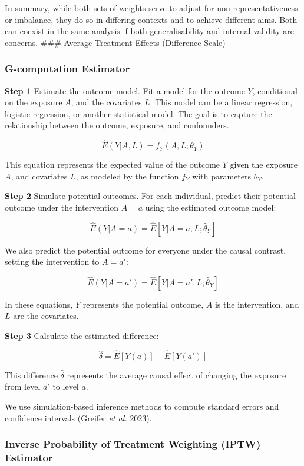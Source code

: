 \documentclass[
  singlecolumn]{article}
\begin{document}
In summary, while both sets of weights serve to adjust for
non-representativeness or imbalance, they do so in differing contexts
and to achieve different aims. Both can coexist in the same analysis if
both generalisability and internal validity are concerns. \#\#\# Average
Treatment Effects (Difference Scale)

\subsubsection{\texorpdfstring{\textbf{G-computation
Estimator}}{G-computation Estimator}}\label{g-computation-estimator}

\textbf{Step 1} Estimate the outcome model. Fit a model for the outcome
\(Y\), conditional on the exposure \(A\), and the covariates \(L\). This
model can be a linear regression, logistic regression, or another
statistical model. The goal is to capture the relationship between the
outcome, exposure, and confounders.

\[ \hat{E}(Y|A,L) = f_Y(A,L; \theta_Y) \]

This equation represents the expected value of the outcome \(Y\) given
the exposure \(A\), and covariates \(L\), as modeled by the function
\(f_Y\) with parameters \(\theta_Y\).

\textbf{Step 2} Simulate potential outcomes. For each individual,
predict their potential outcome under the intervention \(A=a\) using the
estimated outcome model:

\[\hat{E}(Y|A=a)  = \hat{E}[Y|A=a,L; \hat{\theta}_Y]\]

We also predict the potential outcome for everyone under the causal
contrast, setting the intervention to \(A=a'\):

\[  \hat{E}(Y|A=a')  = \hat{E}[Y|A=a',L; \hat{\theta}_Y]\]

In these equations, \(Y\) represents the potential outcome, \(A\) is the
intervention, and \(L\) are the covariates.

\textbf{Step 3} Calculate the estimated difference:

\[\hat{\delta} = \hat{E}[Y(a)] - \hat{E}[Y(a')]\]

This difference \(\hat{\delta}\) represents the average causal effect of
changing the exposure from level \(a'\) to level \(a\).

We use simulation-based inference methods to compute standard errors and
confidence intervals (\hyperref[ref-greifer2023]{Greifer \emph{et al.}
2023}).

\subsubsection{\texorpdfstring{\textbf{Inverse Probability of Treatment
Weighting (IPTW)
Estimator}}{Inverse Probability of Treatment Weighting (IPTW) Estimator}}\label{inverse-probability-of-treatment-weighting-iptw-estimator}
\end{document}
